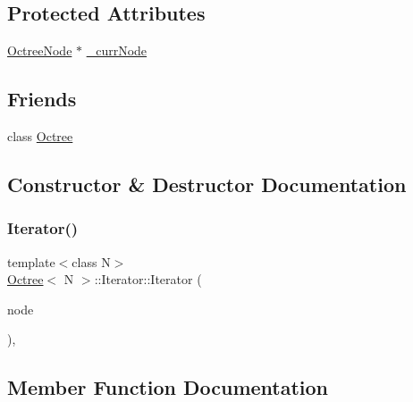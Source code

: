 \subsection*{Protected Attributes}
\begin{DoxyCompactItemize}
\item 
\hyperlink{structOctree_1_1OctreeNode}{Octree\+Node} $\ast$ \hyperlink{classOctree_1_1Iterator_ad8317eed660de125e9ecb2ea75a7e1ef}{\+\_\+curr\+Node}
\end{DoxyCompactItemize}
\subsection*{Friends}
\begin{DoxyCompactItemize}
\item 
class \hyperlink{classOctree_1_1Iterator_acc8a7ec8cf44f290482ad3d68f6a7719}{Octree}
\end{DoxyCompactItemize}


\subsection{Constructor \& Destructor Documentation}
\mbox{\label{classOctree_1_1Iterator_af4b294898f6586f90fbfd1aee3c42252}} 
\subsubsection{\texorpdfstring{Iterator()}{Iterator()}}
{\footnotesize\ttfamily template$<$class N$>$ \\
\hyperlink{classOctree}{Octree}$<$ N $>$\+::Iterator\+::\+Iterator (\begin{DoxyParamCaption}\item[{\hyperlink{structOctree_1_1OctreeNode}{Octree\+Node} $\ast$}]{node }\end{DoxyParamCaption})\hspace{0.3cm}{\ttfamily [inline]}, {\ttfamily [protected]}}



\subsection{Member Function Documentation}
\mbox{\label{classOctree_1_1Iterator_a967ccaaecd324ba6fbbd735d07d5bab8}} 
